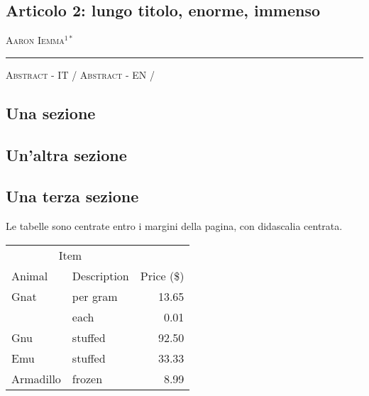 \begin{adjustwidth}{-3.5cm}{0cm}
\pagestyle{CIOpage}
\chapter{Articolo 2: lungo titolo, enorme, immenso}
\textsc{Aaron Iemma}$^{1*}$ \\
\noindent\color{OliveGreen}\rule{27cm}{2pt}
\vspace{1cm}
\end{adjustwidth}

\noindent \textsc{\color{OliveGreen}Abstract - IT} / \lipsum[1]
\vspace{1cm}
\noindent \textsc{\color{OliveGreen}Abstract - EN} / \lipsum[1]

\newpage
\section{Una sezione}

\lipsum[2]

\section{Un'altra sezione}

\lipsum[2]

\section{Una terza sezione}

\lipsum[2]
\vspace{1cm}
Le tabelle sono centrate entro i margini della pagina, con didascalia centrata.

\begin{center}
\begin{tabular}{llr} 
	\toprule 
	\multicolumn{2}{c}{Item} \\ 
	\cmidrule(r){1-2} 
	Animal & Description & Price (\$) \\ 
	\midrule Gnat & per gram & 13.65 \\ & each & 0.01 \\ Gnu & stuffed & 92.50 \\ Emu & stuffed & 33.33 \\ Armadillo & frozen & 8.99 \\ \bottomrule 
\end{tabular}
\end{center}

